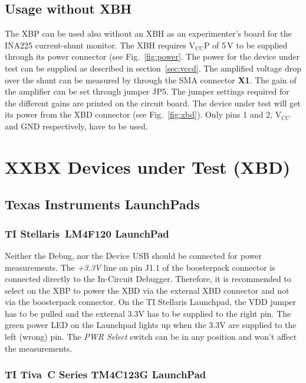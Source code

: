 \documentclass[twoside,11pt]{cergdoc}
\begin{document}
\section{Usage without XBH}\label{sec:noXBH}
The XBP can be used also without an XBH as an experimenter's board for the INA225 
current-shunt monitor. The XBH requires $\mathrm{V_{CC}P}$ of 5\,V to be supplied
through its power connector (see Fig.~\ref{fig:power}. The power for the device 
under test can be supplied as described in section~\ref{sec:vccd}. The amplified
voltage drop over the shunt can be measured by through the SMA connector \textbf{X1}.
The gain of the amplifier can be set through jumper JP5. The jumper settings required
for the different gains are printed on the circuit board. The device under test will
get its power from the XBD connector (see Fig.~\ref{fig:xbd}). Only pins 1 and 2,
V$_{CC}$ and GND respectively, have to be used.


\chapter{XXBX Devices under Test (XBD)}\label{sec:xbd}

\section{Texas Instruments LaunchPads}

\subsection{TI Stellaris\textregistered~LM4F120 LaunchPad}

Neither the Debug, nor the Device USB should be connected for power measurements.
The \emph{+3.3V} line on pin J1.1 of the boosterpack connector is connected 
directly to the In-Circuit Debugger. Therefore, it is recommended to select on the
XBP to power the XBD via the external XBD connector and not via the boosterpack
connector. On the TI Stellaris Launchpad, the VDD jumper has to be pulled and the
external 3.3V has to be supplied to the right pin. The green power LED on the
Launchpad lights up when the 3.3V are supplied to the left (wrong) pin. 
The \emph{PWR Select} switch can be in any position and won't affect the 
measurements.

\subsection{TI Tiva\texttrademark~C Series TM4C123G LaunchPad}
\end{document}
